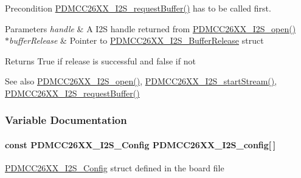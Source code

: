 \begin{DoxyPrecond}{Precondition}
\hyperlink{_p_d_m_c_c26_x_x__util_8h_a69561b9a6f07a82bfe3b18f3c51fcd19}{P\+D\+M\+C\+C26\+X\+X\+\_\+\+I2\+S\+\_\+request\+Buffer()} has to be called first.
\end{DoxyPrecond}

\begin{DoxyParams}{Parameters}
{\em handle} & A I2\+S handle returned from \hyperlink{_p_d_m_c_c26_x_x__util_8h_a8168bcdab9f1e46c26823555df6f797f}{P\+D\+M\+C\+C26\+X\+X\+\_\+\+I2\+S\+\_\+open()}\\
\hline
{\em $\ast$buffer\+Release} & Pointer to \hyperlink{struct_p_d_m_c_c26_x_x___i2_s___buffer_release}{P\+D\+M\+C\+C26\+X\+X\+\_\+\+I2\+S\+\_\+\+Buffer\+Release} struct\\
\hline
\end{DoxyParams}
\begin{DoxyReturn}{Returns}
True if release is successful and false if not
\end{DoxyReturn}
\begin{DoxySeeAlso}{See also}
\hyperlink{_p_d_m_c_c26_x_x__util_8h_a8168bcdab9f1e46c26823555df6f797f}{P\+D\+M\+C\+C26\+X\+X\+\_\+\+I2\+S\+\_\+open()}, \hyperlink{_p_d_m_c_c26_x_x__util_8h_ac318829ebbf5e66a0ee0c23ba3b36ba4}{P\+D\+M\+C\+C26\+X\+X\+\_\+\+I2\+S\+\_\+start\+Stream()}, \hyperlink{_p_d_m_c_c26_x_x__util_8h_a69561b9a6f07a82bfe3b18f3c51fcd19}{P\+D\+M\+C\+C26\+X\+X\+\_\+\+I2\+S\+\_\+request\+Buffer()} 
\end{DoxySeeAlso}


\subsubsection{Variable Documentation}
\paragraph[{P\+D\+M\+C\+C26\+X\+X\+\_\+\+I2\+S\+\_\+config}]{\setlength{\rightskip}{0pt plus 5cm}const {\bf P\+D\+M\+C\+C26\+X\+X\+\_\+\+I2\+S\+\_\+\+Config} P\+D\+M\+C\+C26\+X\+X\+\_\+\+I2\+S\+\_\+config\mbox{[}$\,$\mbox{]}}\label{_p_d_m_c_c26_x_x__util_8h_a1a4dd4e230736baa3d1c7c62528e918c}
\hyperlink{struct_p_d_m_c_c26_x_x___i2_s___config}{P\+D\+M\+C\+C26\+X\+X\+\_\+\+I2\+S\+\_\+\+Config} struct defined in the board file 